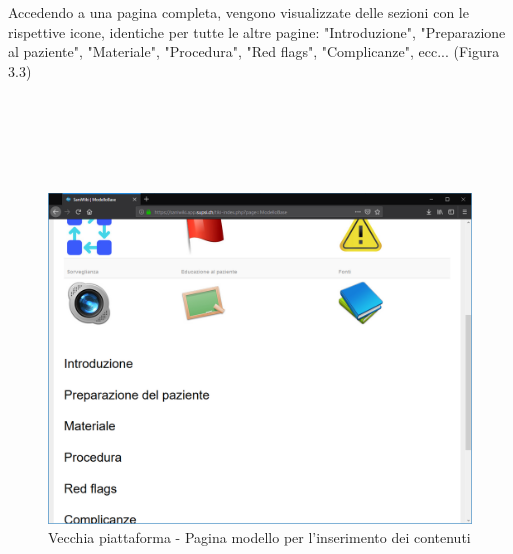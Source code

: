 \documentclass[twoside]{supsistudent}
\begin{document}
Accedendo a una pagina completa, vengono visualizzate delle sezioni con le rispettive icone, identiche per tutte le altre pagine: "Introduzione", "Preparazione al paziente", "Materiale", "Procedura", "Red flags", "Complicanze", ecc... (Figura 3.3)\\\\\\\\\\\\
\begin{figure}[!h]
\centering
\includegraphics[scale=0.23]{saniold_template.png}
\caption{Vecchia piattaforma - Pagina modello per l'inserimento dei contenuti}
\end{figure}
\\\\\\
\end{document}
